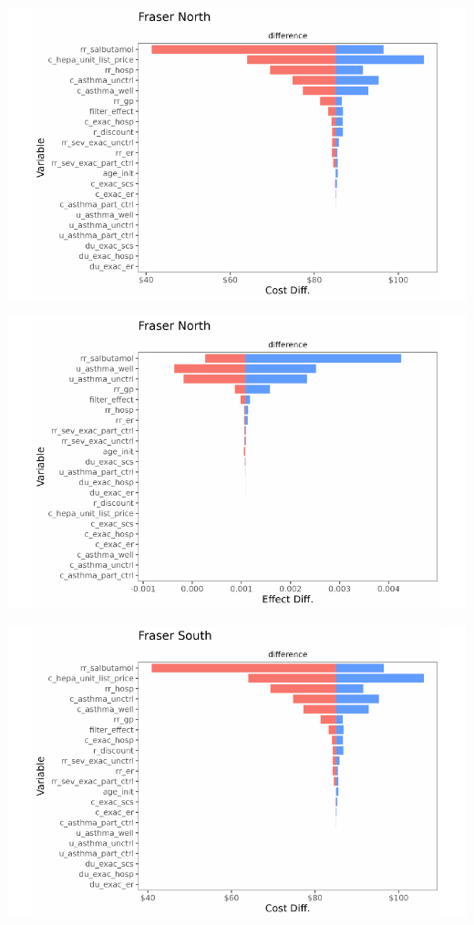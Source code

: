 \documentclass[
  number]{elsarticle}
\begin{document}
\includegraphics{index_files/figure-pdf/unnamed-chunk-9-7.pdf}

\includegraphics{index_files/figure-pdf/unnamed-chunk-9-8.pdf}

\includegraphics{index_files/figure-pdf/unnamed-chunk-9-9.pdf}
\end{document}
